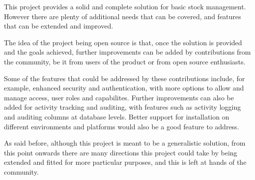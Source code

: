 This project provides a solid and complete solution for basic stock management. However there are plenty of additional needs that can be covered, and features that can be extended and improved.

The idea of the project being open source is that, once the solution is provided and the goals achieved, further improvements can be added by contributions from the community, be it from users of the product or from open source enthusiasts.

Some of the features that could be addressed by these contributions include, for example, enhanced security and authentication, with more options to allow and manage access, user roles and capabilites. Further improvements can also be added for activity tracking and auditing, with features such as activity logging and auditing columns at database levels. Better support for installation on different environments and platforms would also be a good feature to address.

As said before, although this project is meant to be a generalistic solution, from this point onwards there are many directions this project could take by being extended and fitted for more particular purposes, and this is left at hands of the community.